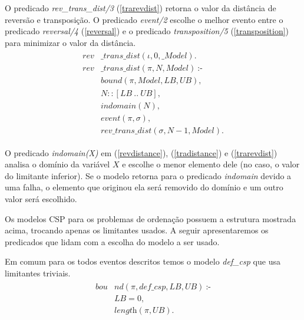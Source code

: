 O predicado \textit{rev\_trans\_dist/3} (\ref{trarevdist}) retorna o
valor da distância de reversão e transposição. O
predicado \textit{event/2} escolhe o melhor evento entre o
predicado \textit{reversal/4} (\ref{reversal}) e o
predicado \textit{transposition/5} (\ref{transposition}) para
minimizar o valor da distância.
\begin{align}
  \label{trarevdist}
  \begin{split}
  \textit{rev}&\textit{\_trans\_dist}(\iota, 0, \_Model). \\
  \textit{rev}&\textit{\_trans\_dist}(\pi, N, Model)~\text{:-} \\
  &\textit{bound}(\pi, Model, LB, UB), \\
  &N :: [LB~..~UB], \\
  &\textit{indomain}(N),  \\
  &\textit{event}(\pi, \sigma),  \\
  &\textit{rev\_trans\_dist}(\sigma, N-1, Model). 
  \end{split}
\end{align}

O predicado \textit{indomain(X)} em (\ref{revdistance}),
(\ref{tradistance}) e (\ref{trarevdist}) analisa o domínio da variável
$X$ e escolhe o menor elemento dele (no caso, o valor do limitante
inferior). Se o modelo retorna para o predicado \textit{indomain}
devido a uma falha, o elemento que originou ela será removido do
domínio e um outro valor será escolhido.

Os modelos CSP para os problemas de ordenação possuem a estrutura
mostrada acima, trocando apenas os limitantes usados. A seguir
apresentaremos os predicados que lidam com a escolha do modelo a ser
usado.

Em comum para os todos eventos descritos temos o
modelo \textit{def\_csp} que usa limitantes triviais.
\begin{align}
  \label{bound_def}
  \begin{split}
  \textit{bou}&\textit{nd}(\pi, def\_csp, LB, UB)~\text{:-} \\
  &LB = 0, \\
  &\textit{length}(\pi, UB).
  \end{split}
\end{align}

